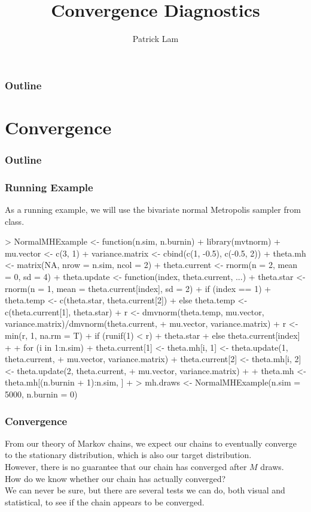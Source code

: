 \documentclass[handout]{beamer}
\author{Patrick Lam}
\title{Convergence Diagnostics}
\date{}
\begin{document}
\newcommand{\red}{\textcolor{red}}
\newcommand{\blue}{\textcolor{blue}}
\newcommand{\purple}{\textcolor{purple}}

\frame{\titlepage}

\begin{frame}
\frametitle{Outline}
\tableofcontents
\end{frame}


\section{Convergence}

\begin{frame}
\frametitle{Outline}
\tableofcontents[currentsection]
\end{frame}


\begin{frame}[fragile]
\frametitle{Running Example}
\pause
As a running example, we will use the bivariate normal Metropolis
sampler from class.
\medskip
\pause
\tiny
\begin{Schunk}
\begin{Sinput}
> NormalMHExample <- function(n.sim, n.burnin) {
+     library(mvtnorm)
+     mu.vector <- c(3, 1)
+     variance.matrix <- cbind(c(1, -0.5), c(-0.5, 2))
+     theta.mh <- matrix(NA, nrow = n.sim, ncol = 2)
+     theta.current <- rnorm(n = 2, mean = 0, sd = 4)
+     theta.update <- function(index, theta.current, ...) {
+         theta.star <- rnorm(n = 1, mean = theta.current[index], sd = 2)
+         if (index == 1) 
+             theta.temp <- c(theta.star, theta.current[2])
+         else theta.temp <- c(theta.current[1], theta.star)
+         r <- dmvnorm(theta.temp, mu.vector, variance.matrix)/dmvnorm(theta.current, 
+             mu.vector, variance.matrix)
+         r <- min(r, 1, na.rm = T)
+         if (runif(1) < r) 
+             theta.star
+         else theta.current[index]
+     }
+     for (i in 1:n.sim) {
+         theta.current[1] <- theta.mh[i, 1] <- theta.update(1, theta.current, 
+             mu.vector, variance.matrix)
+         theta.current[2] <- theta.mh[i, 2] <- theta.update(2, theta.current, 
+             mu.vector, variance.matrix)
+     }
+     theta.mh <- theta.mh[(n.burnin + 1):n.sim, ]
+ }
> mh.draws <- NormalMHExample(n.sim = 5000, n.burnin = 0)
\end{Sinput}
\end{Schunk}
\normalsize
\end{frame}


\begin{frame}
\frametitle{Convergence}
\pause
From our theory of Markov chains, we expect our chains to eventually
converge to the stationary distribution, which is also our target
distribution. \\
\pause
\bigskip
However, there is no guarantee that our chain has converged after $M$ draws.\\
\pause
\bigskip
How do we know whether our chain has actually converged? \\
\pause
\bigskip
We can never be sure, but there are several tests we can do, both
visual and statistical, to see if the chain appears to be converged.
\end{frame}
\end{document}
